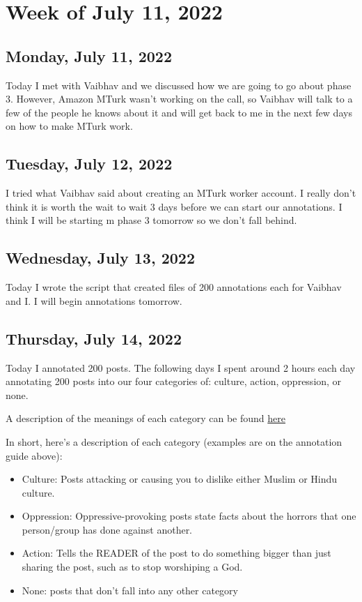 \documentclass[11pt,letterpaper]{article}
\begin{document}
\section{Week of July 11, 2022}

\subsection{Monday, July 11, 2022}
Today I met with Vaibhav and we discussed how we are going to go about phase 3. However, Amazon MTurk wasn't working on the call, so Vaibhav will talk to a few of the people he knows about it and will get back to me in the next few days on how to make MTurk work. 

\subsection{Tuesday, July 12, 2022}
I tried what Vaibhav said about creating an MTurk worker account. I really don't think it is worth the wait to wait 3 days before we can start our annotations. I think I will be starting m phase 3 tomorrow so we don't fall behind.

\subsection{Wednesday, July 13, 2022}
Today I wrote the script that created files of 200 annotations each for Vaibhav and I. I will begin annotations tomorrow.

\subsection{Thursday, July 14, 2022}
Today I annotated 200 posts. The following days I spent around 2 hours each day annotating 200 posts into our four categories of: culture, action, oppression, or none.

A description of the meanings of each category can be found \href{https://docs.google.com/document/d/1tLoClm225HeHbwG9vzvwQSTS5GVb8t2CusXJq6LHmEw/edit?usp=sharing}{here}

In short, here's a description of each category (examples are on the annotation guide above):

\begin{itemize}
    \item Culture: Posts attacking or causing you to dislike either Muslim or Hindu culture. 

    \item Oppression: Oppressive-provoking posts state facts about the horrors that one person/group has done against another.

    \item Action: Tells the READER of the post to do something bigger than just sharing the post, such as to stop worshiping a God. 

    \item None: posts that don't fall into any other category
\end{itemize}
\end{document}
